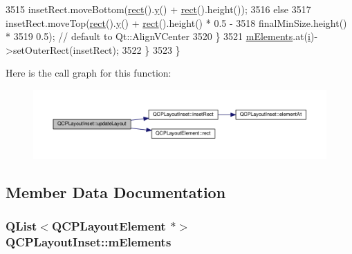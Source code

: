 \begin{DoxyCode}
3515         insetRect.moveBottom(\hyperlink{class_q_c_p_layout_element_affdfea003469aac3d0fac5f4e06171bc}{rect}().\hyperlink{_comparision_pictures_2_createtest_image_8m_a2fb1c5cf58867b5bbc9a1b145a86f3a0}{y}() + \hyperlink{class_q_c_p_layout_element_affdfea003469aac3d0fac5f4e06171bc}{rect}().height());
3516       \textcolor{keywordflow}{else}
3517         insetRect.moveTop(\hyperlink{class_q_c_p_layout_element_affdfea003469aac3d0fac5f4e06171bc}{rect}().\hyperlink{_comparision_pictures_2_createtest_image_8m_a2fb1c5cf58867b5bbc9a1b145a86f3a0}{y}() + \hyperlink{class_q_c_p_layout_element_affdfea003469aac3d0fac5f4e06171bc}{rect}().height() * 0.5 -
3518                           finalMinSize.height() *
3519                               0.5); \textcolor{comment}{// default to Qt::AlignVCenter}
3520     \}
3521     \hyperlink{class_q_c_p_layout_inset_a7e618ac870f69f2fe2eae2a04500e763}{mElements}.at(\hyperlink{_comparision_pictures_2_createtest_image_8m_a6f6ccfcf58b31cb6412107d9d5281426}{i})->setOuterRect(insetRect);
3522   \}
3523 \}
\end{DoxyCode}


Here is the call graph for this function\+:\nopagebreak
\begin{figure}[H]
\begin{center}
\leavevmode
\includegraphics[width=350pt]{class_q_c_p_layout_inset_a7b33fdd51b18e6db7cea9bfb2d263b4a_cgraph}
\end{center}
\end{figure}




\subsection{Member Data Documentation}
\hypertarget{class_q_c_p_layout_inset_a7e618ac870f69f2fe2eae2a04500e763}{}
\subsubsection[{m\+Elements}]{\setlength{\rightskip}{0pt plus 5cm}Q\+List$<${\bf Q\+C\+P\+Layout\+Element} $\ast$$>$ Q\+C\+P\+Layout\+Inset\+::m\+Elements\hspace{0.3cm}{\ttfamily [protected]}}\label{class_q_c_p_layout_inset_a7e618ac870f69f2fe2eae2a04500e763}


